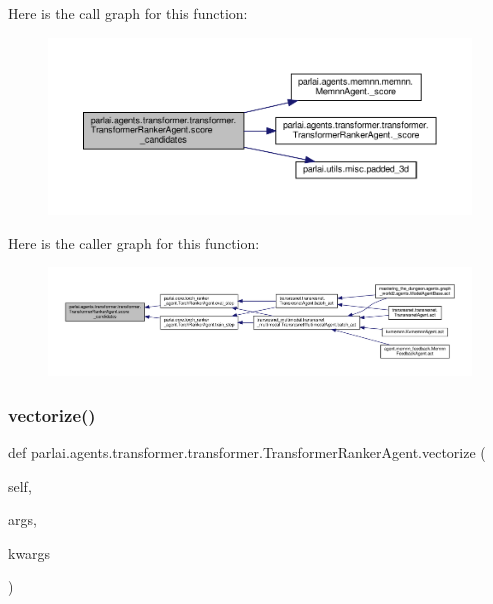 Here is the call graph for this function\+:
\nopagebreak
\begin{figure}[H]
\begin{center}
\leavevmode
\includegraphics[width=350pt]{classparlai_1_1agents_1_1transformer_1_1transformer_1_1TransformerRankerAgent_af1af764f534c04a7bc98f11b3fe8f6ca_cgraph}
\end{center}
\end{figure}
Here is the caller graph for this function\+:
\nopagebreak
\begin{figure}[H]
\begin{center}
\leavevmode
\includegraphics[width=350pt]{classparlai_1_1agents_1_1transformer_1_1transformer_1_1TransformerRankerAgent_af1af764f534c04a7bc98f11b3fe8f6ca_icgraph}
\end{center}
\end{figure}
\mbox{\label{classparlai_1_1agents_1_1transformer_1_1transformer_1_1TransformerRankerAgent_a76ba1a57647f32877fce85a064952c5d}} 
\subsubsection{\texorpdfstring{vectorize()}{vectorize()}}
{\footnotesize\ttfamily def parlai.\+agents.\+transformer.\+transformer.\+Transformer\+Ranker\+Agent.\+vectorize (\begin{DoxyParamCaption}\item[{}]{self,  }\item[{}]{args,  }\item[{}]{kwargs }\end{DoxyParamCaption})}

